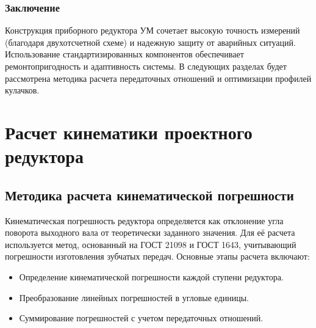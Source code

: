 


\subsubsection*{Заключение}
Конструкция приборного редуктора УМ сочетает высокую точность измерений (благодаря двухотсчетной схеме) и надежную защиту от аварийных ситуаций. Использование стандартизированных компонентов обеспечивает ремонтопригодность и адаптивность системы. В следующих разделах будет рассмотрена методика расчета передаточных отношений и оптимизации профилей кулачков.



\section{Расчет кинематики проектного редуктора}
\subsection{Методика расчета кинематической погрешности}

Кинематическая погрешность редуктора определяется как отклонение угла поворота выходного вала от теоретически заданного значения. Для её расчета используется метод, основанный на ГОСТ 21098 и ГОСТ 1643, учитывающий погрешности изготовления зубчатых передач. Основные этапы расчета включают:
\begin{itemize}
    \item Определение кинематической погрешности каждой ступени редуктора.
    \item Преобразование линейных погрешностей в угловые единицы.
    \item Суммирование погрешностей с учетом передаточных отношений.
\end{itemize}

